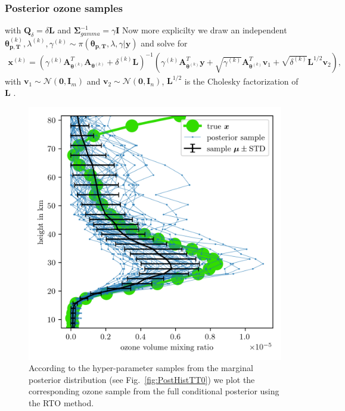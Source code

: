 \subsubsection{Posterior ozone samples}
with $\bm{Q}_{\delta} = \delta  \bm{L} $ and $\bm{\Sigma}^{-1}_{gamma} = \gamma \bm{I}$
Now more explicilty we draw an independent $\bm{\theta}^{(k)}_{\bm{p}, \bm{T}},\lambda^{(k)},\gamma^{(k)} \sim \pi(\bm{\theta}_{\bm{p}, \bm{T}},\lambda,\gamma | \bm{y})$ and solve for 
\begin{align}
	\label{eq:RTO}
	\bm{x}^{(k)} = 	\left(  \gamma^{(k)} \bm{A}_{\bm{\theta}^{(k)}}^T\bm{A}_{\bm{\theta}^{(k)}} +  \delta^{(k)}\bm{L} \right)^{-1} \left(  \gamma^{(k)}  \bm{A}_{\bm{\theta}^{(k)}}^T\bm{y} +\sqrt{\gamma^{(k)}} \bm{A}_{\bm{\theta}^{(k)}}^T \bm{v}_1 + \sqrt{\delta^{(k)}}\bm{L}^{1/2}\bm{v}_2\right),
\end{align}
with $\bm{v}_1 \sim \mathcal{N}(\bm{0},  \bm{I}_m )$ and $\bm{v}_2 \sim \mathcal{N}(\bm{0}, \bm{I}_n )$,  $\bm{L}^{1/2}$ is the Cholesky factorization of $\bm{L}$ \cite{bardsley2012mcmc}.
\begin{figure}[ht!]
	\centering
	\includegraphics{FullO3Res.png}
	\caption[Pressure posterior samples.]{According to the hyper-parameter samples from the marginal posterior distribution (see Fig.~\ref{fig:PostHistTT0}) we plot the corresponding ozone sample from the full conditional posterior using the RTO method.}
	\label{fig:O3Post}
\end{figure}

